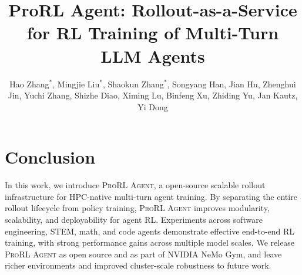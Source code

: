 \documentclass[10pt,logo,copyright]{nvidiatechreport}
\title{ProRL Agent: Rollout-as-a-Service for RL Training of Multi-Turn LLM Agents}
\author{Hao Zhang$^*$, Mingjie Liu$^*$, Shaokun Zhang$^*$, Songyang Han, Jian Hu, Zhenghui Jin, Yuchi Zhang, Shizhe Diao, Ximing Lu, Binfeng Xu, Zhiding Yu, Jan Kautz, Yi Dong
}
\begin{document}
\maketitle
\abscontent






\section{Conclusion}

In this work, we introduce \textsc{ProRL Agent}, a open-source scalable rollout infrastructure for HPC-native multi-turn agent training. 
By separating the entire rollout lifecycle from policy training, \textsc{ProRL Agent} improves modularity, scalability, and deployability for agent RL. Experiments across software engineering, STEM, math, and code agents demonstrate effective end-to-end RL training, with strong performance gains across multiple model scales. We release \textsc{ProRL Agent} as open source and as part of NVIDIA NeMo Gym, and leave richer environments and improved cluster-scale robustness to future work.

\clearpage
\newpage




\newpage
\appendix
\onecolumn

\end{document}
